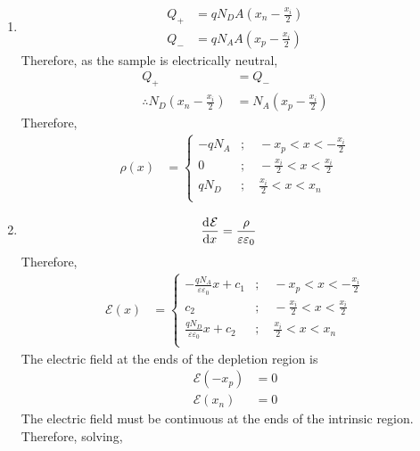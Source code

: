 \documentclass[titlepage, fleqn, a4paper, 12pt, twoside]{article}
\theoremstyle{definition}
\theoremstyle{theorem}
\begin{document}
\begin{solution}
	\begin{enumerate}[leftmargin=*]
		\item
			\begin{align*}
				Q_+ &= q N_D A \left( x_n - \frac{x_i}{2} \right)\\
				Q_- &= q N_A A \left( x_p - \frac{x_i}{2} \right)
			\end{align*}
			Therefore, as the sample is electrically neutral,
			\begin{align*}
				Q_+ &= Q_-\\
				\therefore N_D \left( x_n - \frac{x_i}{2} \right) &= N_A \left( x_p - \frac{x_i}{2} \right)
			\end{align*}
			Therefore,
			\begin{align*}
				\rho(x) &=
					\begin{cases}
						-q N_A & ;\quad -x_p < x < -\frac{x_i}{2}          \\
						0      & ;\quad -\frac{x_i}{2} < x < \frac{x_i}{2} \\
						q N_D  & ;\quad \frac{x_i}{2} < x < x_n            \\
					\end{cases}
			\end{align*}
		\item
			\begin{align*}
				\dod{\mathcal{E}}{x} &= \frac{\rho}{\varepsilon \varepsilon_0}
			\end{align*}
			Therefore,
			\begin{align*}
				\mathcal{E}(x) &=
					\begin{cases}
						-\frac{q N_A}{\varepsilon \varepsilon_0} x + c_1 & ;\quad -x_p < x < -\frac{x_i}{2}          \\
						c_2 & ;\quad -\frac{x_i}{2} < x < \frac{x_i}{2} \\
						\frac{q N_D}{\varepsilon \varepsilon_0} x + c_2 & ;\quad \frac{x_i}{2} < x < x_n            \\
					\end{cases}
			\end{align*}
			The electric field at the ends of the depletion region is
			\begin{align*}
				\mathcal{E}(-x_p) &= 0\\
				\mathcal{E}(x_n) &= 0
			\end{align*}
			The electric field must be continuous at the ends of the intrinsic region.
			Therefore, solving,
			\begin{align*}

\end{align*}
\end{enumerate}
\end{solution}
\end{document}
